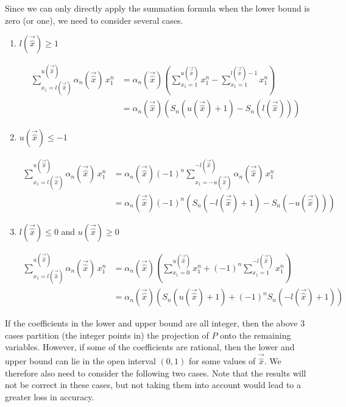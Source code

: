 Since we can only directly apply the summation formula when
the lower bound is zero (or one), we need to consider several
cases.
\begin{enumerate}
\item $l(\vec {\hat x}) \ge 1$

\begin{align*}
\sum_{x_1 = l(\vec {\hat x})}^{u(\vec{\hat x})} \alpha_n(\vec{\hat x}) \, x_1^n
& =
\alpha_n(\vec{\hat x})
\left(
\sum_{x_1 = 1}^{u(\vec{\hat x})} x_1^n
-
\sum_{x_1 = 1}^{l(\vec {\hat x})-1} x_1^n
\right)
\\
& =
\alpha_n(\vec{\hat x})
\left( S_n(u(\vec{\hat x})+1) - S_n(l(\vec {\hat x})) \right)
\end{align*}

\item $u(\vec{\hat x}) \le -1$

\begin{align*}
\sum_{x_1 = l(\vec {\hat x})}^{u(\vec{\hat x})} \alpha_n(\vec{\hat x}) \, x_1^n
& =
\alpha_n(\vec{\hat x}) (-1)^n
\sum_{x_1 = -u(\vec {\hat x})}^{-l(\vec{\hat x})} \alpha_n(\vec{\hat x}) \, x_1^n
\\
& =
\alpha_n(\vec{\hat x}) (-1)^n
\left( S_n(-l(\vec{\hat x})+1) - S_n(-u(\vec {\hat x})) \right)
\end{align*}

\item $l(\vec {\hat x}) \le 0$ and $u(\vec{\hat x}) \ge 0$

\begin{align*}
\sum_{x_1 = l(\vec {\hat x})}^{u(\vec{\hat x})} \alpha_n(\vec{\hat x}) \, x_1^n
& =
\alpha_n(\vec{\hat x})
\left(
\sum_{x_1 = 0}^{u(\vec{\hat x})} x_1^n
+
(-1)^n
\sum_{x_1 = 1}^{-l(\vec {\hat x})} x_1^n
\right)
\\
& =
\alpha_n(\vec{\hat x})
\left(
S_n(u(\vec{\hat x})+1)
+
(-1)^n
S_n(-l(\vec{\hat x})+1)
\right)
\end{align*}

\setcounter{saveenumi}{\value{enumi}}
\end{enumerate}

If the coefficients in the lower and upper bound are all
integer, then the above 3 cases partition (the integer points in)
the projection of $P$ onto the remaining variables.
However, if some of the coefficients are rational, then the lower
and upper bound can lie in the open interval $(0,1)$ for some
values of $\vec{\hat x}$.  We therefore also need to consider
the following two cases.
Note that the results will not be correct in these cases, but
not taking them into account would lead to a greater loss in accuracy.

